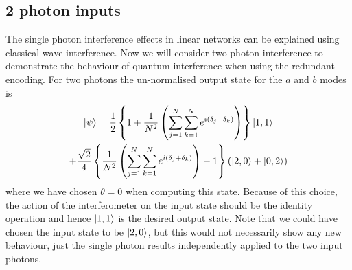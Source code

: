 \documentclass[aps,pra,twocolumn,superscriptaddress,numerical,floatfix]{revtex4-1}
\begin{document}
\subsection{2 photon inputs\label{2 photons N arbitrary}}

The single photon interference effects in linear networks can be explained using classical wave interference.  Now we will consider two photon interference to demonstrate the behaviour of quantum interference when using the redundant encoding.  For two photons the un-normalised output state for the $a$ and $b$ modes is
\begin{multline}
	\ket{\psi} =  \frac{1}{2}\left\{ 1+\frac{1}{N^{2}}\left(\sum_{j=1}^{N}\sum_{k=1}^{N}e^{i(\delta_{j}+\delta_{k})}\right)\right\} \ket{1,1} \\
	+\frac{\sqrt{2}}{4}\left\{ \frac{1}{N^{2}}\left(\sum_{j=1}^{N}\sum_{k=1}^{N}e^{i(\delta_{j}+\delta_{k})}\right)-1\right\} \left(\ket{2,0} +\ket{0,2}\right)\label{eq:2pNarbitrary S}
\end{multline}
where we have chosen $\theta=0$ when computing this state.  Because of this choice, the action of the interferometer on the input state should be the identity operation and hence $\ket{1,1}$ is the desired output state.   Note that we could have chosen the input state to be $\ket{2,0}$, but this would not necessarily show any new behaviour, just the single photon results independently applied to the two input photons. 
\end{document}
